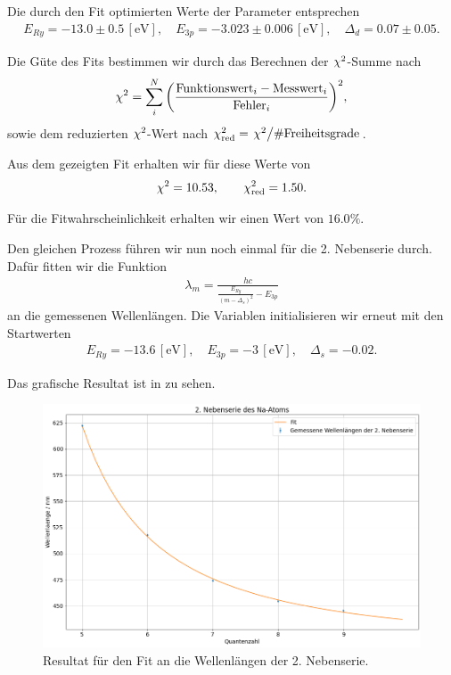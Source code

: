 Die durch den Fit optimierten Werte der Parameter entsprechen
\begin{align}
  E_{Ry} = -13.0 \pm 0.5\, [\si{\electronvolt}], \quad
  E_{3p} = -3.023 \pm 0.006\, [\si{\electronvolt}], \quad
  \Delta_d = 0.07 \pm 0.05.
\end{align}

Die Güte des Fits bestimmen wir durch das Berechnen der $\chi^{2}$-Summe nach
\begin{align}
  \chi^{2} = \sum_{i}^{N} \qty(\frac{\text{Funktionswert}_i - \text{Messwert}_i}{\text{Fehler}_i})^2,
\end{align}
sowie dem reduzierten $\chi^{2}$-Wert nach $\chisqrd = \flatfrac{\chisq}{\#\text{Freiheitsgrade}}$.

Aus dem gezeigten Fit erhalten wir für diese Werte von
\begin{align}
  \chi^{2} = 10.53,\qquad \chi^{2}_{\mathrm{red}} = 1.50.
\end{align}

Für die Fitwahrscheinlichkeit erhalten wir einen Wert von $16.0\%$.

Den gleichen Prozess führen wir nun noch einmal für die 2. Nebenserie durch. Dafür fitten wir die Funktion
\begin{align}
  \lambda_m = \frac{hc}{\frac{E_{Ry}}{(m - \Delta_s)^2} - E_{3p}}
\end{align}
an die gemessenen Wellenlängen. Die Variablen initialisieren wir erneut mit den Startwerten
\begin{align}
  E_{Ry} = -13.6\, [\si{\electronvolt}], \quad
  E_{3p} = -3\, [\si{\electronvolt}], \quad
  \Delta_s = -0.02.
\end{align}

Das grafische Resultat ist in  zu sehen.

\begin{figure}[H]
  \centering
  \includegraphics[width=.9\textwidth]{files/plots/na_2ns_fit.png}
  \caption{Resultat für den Fit an die Wellenlängen der 2. Nebenserie.}
  \label{fig:na_2ns_fit}
\end{figure}

